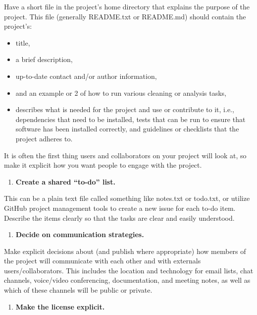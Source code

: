 \documentclass[
]{book}
\providecommand{\tightlist}{%
  \setlength{\itemsep}{0pt}\setlength{\parskip}{0pt}}
\begin{document}
Have a short file in the project's home directory that explains the purpose of the project. This file (generally README.txt or README.md) should contain the project's:

\begin{itemize}
\tightlist
\item
  title,
\item
  a brief description,
\item
  up-to-date contact and/or author information,
\item
  and an example or 2 of how to run various cleaning or analysis tasks,
\item
  describes what is needed for the project and use or contribute to it, i.e., dependencies that need to be installed, tests that can be run to ensure that software has been installed correctly, and guidelines or checklists that the project adheres to.
\end{itemize}

It is often the first thing users and collaborators on your project will look at, so make it explicit how you want people to engage with the project.

\begin{enumerate}
\def\labelenumi{\arabic{enumi}.}
\setcounter{enumi}{1}
\tightlist
\item
  \textbf{Create a shared ``to-do'' list.}
\end{enumerate}

This can be a plain text file called something like notes.txt or todo.txt, or utilize GitHub project management tools to create a new issue for each to-do item. Describe the items clearly so that the tasks are clear and easily understood.

\begin{enumerate}
\def\labelenumi{\arabic{enumi}.}
\setcounter{enumi}{2}
\tightlist
\item
  \textbf{Decide on communication strategies.}
\end{enumerate}

Make explicit decisions about (and publish where appropriate) how members of the project will communicate with each other and with externals users/collaborators. This includes the location and technology for email lists, chat channels, voice/video conferencing, documentation, and meeting notes, as well as which of these channels will be public or private.

\begin{enumerate}
\def\labelenumi{\arabic{enumi}.}
\setcounter{enumi}{3}
\tightlist
\item
  \textbf{Make the license explicit.}
\end{enumerate}
\end{document}

